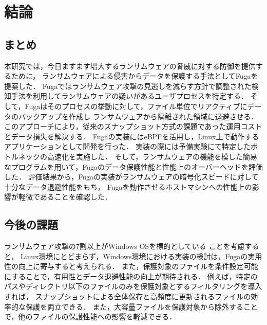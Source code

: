 \chapter{結論}
\label{chap:conclusion}
\section{まとめ}
本研究では，今日ますます増大するランサムウェアの脅威に対する防御を提供するために，
ランサムウェアによる侵害からデータを保護する手法としてFugaを提案した．
Fugaではランサムウェア攻撃の見逃しを減らす方針で調整された検知手法を利用してランサムウェアの疑いがあるユーザプロセスを特定する．
そして，Fugaはそのプロセスの挙動に対して，ファイル単位でリアクティブにデータのバックアップを作成し
ランサムウェアから隔離された領域に退避させる．
このアプローチにより，従来のスナップショット方式の課題であった運用コストとデータ損失を解決する．
Fugaの実装にはeBPFを活用し，Linux上で動作するアプリケーションとして開発を行った．
実装の際には予備実験にて特定したボトルネックの高速化を実施した．
そして，ランサムウェアの機能を模した簡易なプログラムを用いて，Fugaのデータ保護性能と性能上のオーバーヘッドを評価した．
評価結果から，Fugaの実装がランサムウェアの暗号化スピードに対して十分なデータ退避性能をもち，
Fugaを動作させるホストマシンへの性能上の影響が軽微であることを確認した．

\section{今後の課題}
ランサムウェア攻撃の7割以上がWindows OSを標的としている \cite{trendmicro-report} ことを考慮すると，
Linux環境にとどまらず，Windows環境における実装の検討は，Fugaの実用性の向上に寄与すると考えられる．
また，保護対象のファイルを条件設定可能にすることで，有用性とデータ退避性能の向上が期待される．
例えば，特定のパスやディレクトリ以下のファイルのみを保護対象とするフィルタリングを導入すれば，
スナップショットによる全体保存と高頻度に更新されるファイルの効率的な保護を両立できる．
また，大容量ファイルを保護対象から除外することで，他のファイルの保護性能への影響を軽減できる．


